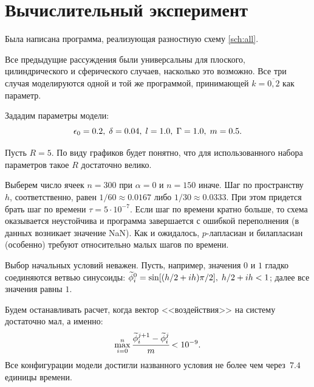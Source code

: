 
\section{Вычислительный эксперимент}

Была написана программа, реализующая разностную схему \eqref{sch:all}.

Все предыдущие рассуждения были универсальны для плоского, цилиндрического и сферического случаев, насколько это возможно. Все три случая моделируются одной и той же программой, принимающей $k = \overline{0, 2}$ как параметр.

Зададим параметры модели:
$$\epsilon_0 = 0.2, \; \delta = 0.04, \; l = 1.0, \; \Gamma = 1.0, \; m = 0.5 {\text{.}}$$

Пусть $R = 5$. По виду графиков будет понятно, что для использованного набора параметров такое $R$ достаточно велико.

Выберем число ячеек $n = 300$ при $\alpha = 0$ и $n = 150$ иначе. Шаг по пространству~$h$, соответственно, равен $1/60 \approx 0.0167$ либо $1/30 \approx 0.0333$. При этом придется брать шаг по времени $\tau = 5 \cdot 10^{-7}$. Если шаг по времени кратно больше, то схема оказывается неустойчива и программа завершается с ошибкой переполнения (в данных возникает значение NaN). Как и ожидалось, $p$-лапласиан и билапласиан (особенно) требуют относительно малых шагов по времени.

Выбор начальных условий неважен. Пусть, например, значения $0$ и $1$ гладко соединяются ветвью синусоиды: ${\widetilde{\phi}}_i^0 = \sin[(h/2 + ih) \pi / 2], \; h/2 + ih < 1$; далее все значения равны $1$.

Будем останавливать расчет, когда вектор <<воздействия>> на систему достаточно мал, а именно:
$$\max\limits_{i = 0}^n \cfrac{{\widetilde{\phi}}_i^{j + 1} - {\widetilde{\phi}}_i^j}{m} < 10^{-9} {\text{.}}$$
Все конфигурации модели достигли названного условия не более чем через~$7.4$ единицы времени.

